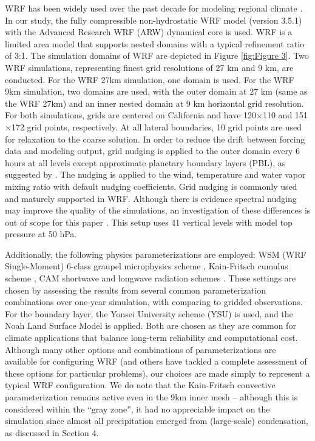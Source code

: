 \documentclass[draft,ms]{agutex}   %
\begin{document}
\begin{article}
WRF has been widely used over the past decade for modeling regional climate \citep{lo2008assessment, leung2009atmospheric, soares2012wrf, sun2015hybrid}. In our study, the fully compressible non-hydrostatic WRF model (version 3.5.1) with the Advanced Research WRF (ARW) dynamical core is used.  WRF is a limited area model that supports nested domains with a typical refinement ratio of 3:1.  The simulation domains of WRF are depicted in Figure \ref{fig:Figure 3}. Two WRF simulations, representing finest grid resolutions of 27 km and 9 km, are conducted.  For the WRF 27km simulation, one domain is used. For the WRF 9km simulation, two domains are used, with the outer domain at 27 km (same as the WRF 27km) and an inner nested domain at 9 km horizontal grid resolution. For both simulations,  grids are centered on California and have 120$\times$110 and 151$\times$172 grid points, respectively. At all lateral boundaries, 10 grid points are used for relaxation to the coarse solution. In order to reduce the drift between forcing data and modeling output, grid nudging \citep{stauffer1990use} is applied to the outer domain every 6 hours at all levels except approximate planetary boundary layers (PBL), as suggested by \cite{lo2008assessment}. The nudging is applied to the wind, temperature and water vapor mixing ratio with default nudging coefficients. Grid nudging is commonly used and maturely supported in WRF. Although there is evidence spectral nudging may improve the quality of the simulations, an investigation of these differences is out of scope for this paper \citep{liu2012differences}. This setup uses 41 vertical levels with model top pressure at 50 hPa.

Additionally, the following physics parameterizations are employed: WSM (WRF Single-Moment) 6-class graupel microphysics scheme \citep{hong2006wrf}, Kain-Fritsch cumulus scheme \citep{kain2004kain}, CAM shortwave and longwave radiation schemes \citep{collins2004description}.  These settings are chosen by assessing the results from several common parameterization combinations over one-year simulation, with comparing to gridded observations. For the boundary layer, the Yonsei University scheme (YSU) \citep{hong2006new} is used, and the Noah Land Surface Model \citep{chen2001coupling} is applied. Both are chosen as they are common for climate applications that balance long-term reliability and computational cost.  Although many other options and combinations of parameterizations are available for configuring WRF (and others have tackled a complete assessment of these options for particular problems), our choices are made simply to represent a typical WRF configuration. We do note that the Kain-Fritsch convective parameterization remains active even in the 9km inner mesh -- although this is considered within the ``gray zone'', it had no appreciable impact on the simulation since almost all precipitation emerged from (large-scale) condensation, as discussed in Section 4.


\end{article}
\end{document}
